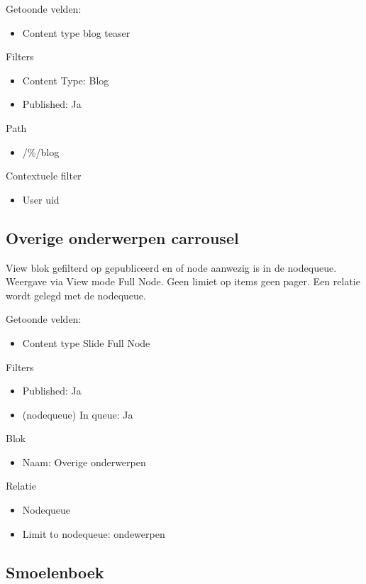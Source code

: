 Getoonde velden: 
\begin{itemize}
\item Content type blog teaser
\end{itemize}

Filters
\begin{itemize}
\item Content Type: Blog
\item Published: Ja
\end{itemize}

Path
\begin{itemize}
\item /\%/blog
\end{itemize}

Contextuele filter
\begin{itemize}
\item User uid
\end{itemize}

\subsection{Overige onderwerpen carrousel}
View blok gefilterd op gepubliceerd en of node aanwezig is in de nodequeue. Weergave via View mode Full Node. Geen limiet op items geen pager. Een relatie wordt gelegd met de nodequeue.

Getoonde velden: 
\begin{itemize}
\item Content type Slide Full Node
\end{itemize}

Filters
\begin{itemize}
\item Published: Ja
\item (nodequeue) In queue: Ja
\end{itemize}

Blok
\begin{itemize}
\item Naam: Overige onderwerpen
\end{itemize}

Relatie
\begin{itemize}
\item Nodequeue
\item Limit to nodequeue: ondewerpen
\end{itemize}

\subsection{Smoelenboek}
